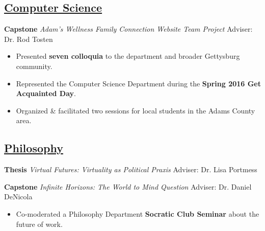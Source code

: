 \documentclass[11pt]{article}
\begin{document}
\subsection*{\underline{Computer Science}}
\textbf{Capstone} \textit{Adam's Wellness Family Connection Website Team Project} \hfill Adviser: Dr. Rod Tosten
\begin{itemize}[noitemsep]
	\item Presented \textbf{seven colloquia} to the department and broader Gettysburg community.
	\item Represented the Computer Science Department during the \textbf{Spring 2016 Get Acquainted Day}. 
	\item Organized \& facilitated two  sessions for local students in the Adams County area.
\end{itemize}

\subsection*{\underline{Philosophy}}
\textbf{Thesis} \textit{Virtual Futures: Virtuality as Political Praxis} \hfill Adviser: Dr. Lisa Portmess

\textbf{Capstone} \textit{Infinite Horizons: The World to Mind Question} \hfill Adviser: Dr. Daniel DeNicola
\begin{itemize}[noitemsep]
	\item Co-moderated a Philosophy Department \textbf{Socratic Club Seminar} about the future of work.
\end{itemize}
\end{document}
